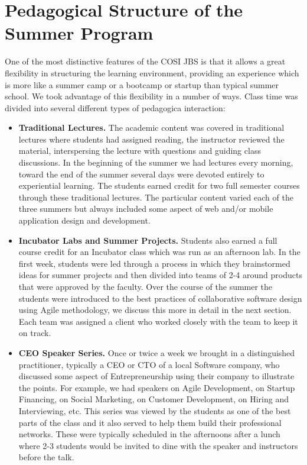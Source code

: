 \documentclass{sig-alternate}
\begin{document}
\section{Pedagogical Structure of the Summer Program}
One of the most distinctive features of the COSI JBS is that it allows a great flexibility in structuring the learning environment, providing an experience which is more like a summer camp or a bootcamp  or startup than typical summer school. We took advantage of this flexibility in a number of ways. Class time was divided into several different types of pedagogica interaction:
\begin{itemize}
\item {\bf Traditional Lectures.} The academic content was covered in traditional lectures where students had assigned reading, the instructor reviewed the material, interspersing the lecture with questions and guiding class discussions. In the beginning of the summer we had lectures every morning, toward the end of the summer several days were devoted entirely to experiential learning. The students earned credit for two full semester courses through these traditional lectures. The particular content varied each of the three summers but always included some aspect of web and/or mobile application design and development.
\item{\bf Incubator Labs and Summer Projects.}  Students also earned a full course credit for an Incubator class which was run as an afternoon lab. In the first week, students were led through a process in which they brainstormed ideas for summer projects and then divided into teams of 2-4 around products that were approved by the faculty. Over the course of the summer the students were introduced to the best practices of collaborative software design using Agile methodology, we discuss this more in detail in the next section. Each team was assigned a client who worked closely with the team to keep it on track.
\item{\bf CEO Speaker Series.} Once or twice a week we brought in a distinguished practitioner, typically a CEO or CTO of a local Software company, who discussed some aspect of Entrepreneurship using their company to illustrate the points. For example, we had speakers on Agile Development, on Startup Financing, on Social Marketing, on Customer Development, on Hiring and Interviewing, etc. This series was viewed by the students as one of the best parts of the class and it also served to help them build their professional networks. These were typically scheduled in the afternoons after a lunch where 2-3 students would be invited to dine with the speaker and instructors before the talk.

\end{itemize}
\end{document}

